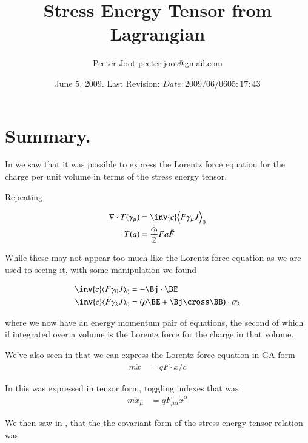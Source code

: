 \documentclass{article}
\title{Stress Energy Tensor from Lagrangian}\label{chap:stress_energy_noethers}
\author{Peeter Joot \quad peeter.joot@gmail.com }
\date{ June 5, 2009.  Last Revision: $Date: 2009/06/06 05:17:43 $ }
\begin{document}
\maketitle{}
\tableofcontents
\section{ Summary. }

In 
\cite{PJstressEnergyLorentz} 
we saw that it was
possible to express the Lorentz force equation for the charge per unit
volume in terms of the stress energy tensor.

Repeating 

\begin{align}
\grad \cdot T(\gamma_\mu) &= \inv{c} \gpgradezero{ F \gamma_\mu J } \\
T(a) &= \frac{\epsilon_0}{2} F a \tilde{F}
\end{align}

While these
may not appear too much like the Lorentz force equation as we are used
to seeing it, with some manipulation we found 

\begin{align}
\inv{c} \gpgradezero{ F \gamma_0 J } &= -\Bj \cdot \BE \\
\inv{c} \gpgradezero{ F \gamma_k J } &= (\rho \BE + \Bj \cross \BB) \cdot \sigma_k
\end{align}

where we now have an energy momentum pair of equations, the second
of which if integrated over a volume is the Lorentz force for the charge
in that volume.

We've also seen in
that we can express the Lorentz force equation in GA form
\begin{align}
m \ddot{x} &= q F \cdot \dot{x}/c
\end{align}

In 
this was expressed in tensor form, toggling indexes that was
\begin{align}
m \ddot{x}_\mu &= {q} F_{\mu\alpha} \dot{x}^\alpha
\end{align}

We then saw in
\cite{PJenMtensor}
, that the
the covariant form of the stress energy tensor relation was
\end{document}
